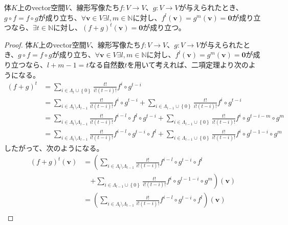 \documentclass[dvipdfmx]{jsarticle}
\begin{document}
\begin{thm}
\label{2.2.4.2}
体$K$上のvector空間$V$、線形写像たち$f:V \rightarrow V$、$g:V \rightarrow V$が与えられたとき、$g \circ f = f \circ g$が成り立ち、$\forall\mathbf{v} \in V\exists l,m \in \mathbb{N}$に対し、$f^{l}\left( \mathbf{v} \right) = g^{m}\left( \mathbf{v} \right) = \mathbf{0}$が成り立つなら、$\exists t \in \mathbb{N}$に対し、$(f + g)^{t}\left( \mathbf{v} \right) = \mathbf{0}$が成り立つ。
\end{thm}
\begin{proof}
体$K$上のvector空間$V$、線形写像たち$f:V \rightarrow V$、$g:V \rightarrow V$が与えられたとき、$g \circ f = f \circ g$が成り立ち、$\forall\mathbf{v} \in V\exists l,m \in \mathbb{N}$に対し、$f^{l}\left( \mathbf{v} \right) = g^{m}\left( \mathbf{v} \right) = \mathbf{0}$が成り立つなら、$l + m - 1 = t$なる自然数$t$を用いて考えれば、二項定理より次のようになる。
\begin{align*}
(f + g)^{t} &= \sum_{i \in \varLambda_{t} \cup \left\{ 0 \right\}} {\frac{t!}{i!(t - i)!}f^{i} \circ g^{t - i}}\\
&= \sum_{i \in \varLambda_{t} \setminus \varLambda_{l - 1} } {\frac{t!}{i!(t - i)!}f^{i} \circ g^{t - i}} + \sum_{i \in \varLambda_{l - 1} \cup \left\{ 0 \right\} } {\frac{t!}{i!(t - i)!}f^{i} \circ g^{t - i}}\\
&= \sum_{i \in \varLambda_{t} \setminus \varLambda_{l - 1} } {\frac{t!}{i!(t - i)!}f^{i - l} \circ f^{l} \circ g^{t - i}} + \sum_{i \in \varLambda_{l - 1} \cup \left\{ 0 \right\} } {\frac{t!}{i!(t - i)!}f^{i} \circ g^{t - i - m} \circ g^{m}}\\
&= \sum_{i \in \varLambda_{t} \setminus \varLambda_{l - 1} } {\frac{t!}{i!(t - i)!}f^{i - l} \circ g^{t - i} \circ f^{l}} + \sum_{i \in \varLambda_{l - 1} \cup \left\{ 0 \right\} } {\frac{t!}{i!(t - i)!}f^{i} \circ g^{l - 1 - i} \circ g^{m}}
\end{align*}
したがって、次のようになる。
\begin{align*}
(f + g)^{t}\left( \mathbf{v} \right) &= \left( \sum_{i \in \varLambda_{t} \setminus \varLambda_{l - 1}} {\frac{t!}{i!(t - i)!}f^{i - l} \circ g^{t - i} \circ f^{l}} \right. \\
&\quad \left.+ \sum_{i \in \varLambda_{l - 1} \cup \left\{ 0 \right\}} {\frac{t!}{i!(t - i)!}f^{i} \circ g^{l - 1 - i} \circ g^{m}} \right)\left( \mathbf{v} \right)\\
&= \left( \sum_{i \in \varLambda_{t} \setminus \varLambda_{l - 1}} {\frac{t!}{i!(t - i)!}f^{i - l} \circ g^{t - i} \circ f^{l}} \right)\left( \mathbf{v} \right) \\

\end{align*}
\end{proof}
\end{document}
